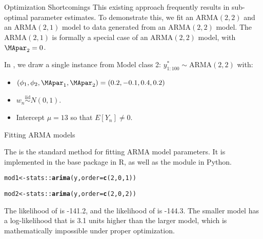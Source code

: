 \documentclass[aspectratio=169]{beamer}\usepackage[]{graphicx}\usepackage[]{xcolor}
\makeatletter
\newcommand{\hlnum}[1]{\textcolor[rgb]{0.686,0.059,0.569}{#1}}%
\newcommand{\hlopt}[1]{\textcolor[rgb]{0,0,0}{#1}}%
\newcommand{\hldef}[1]{\textcolor[rgb]{0.345,0.345,0.345}{#1}}%
\newcommand{\hlkwb}[1]{\textcolor[rgb]{0.69,0.353,0.396}{#1}}%
\newcommand{\hlkwc}[1]{\textcolor[rgb]{0.333,0.667,0.333}{#1}}%
\newcommand{\hlkwd}[1]{\textcolor[rgb]{0.737,0.353,0.396}{\textbf{#1}}}%
\newenvironment{kframe}{%
 \def\at@end@of@kframe{}%
 \ifinner\ifhmode%
  \def\at@end@of@kframe{\end{minipage}}%
  \begin{minipage}{\columnwidth}%
 \fi\fi%
 \def\FrameCommand##1{\hskip\@totalleftmargin \hskip-\fboxsep
 \colorbox{shadecolor}{##1}\hskip-\fboxsep
     \hskip-\linewidth \hskip-\@totalleftmargin \hskip\columnwidth}%
 \MakeFramed {\advance\hsize-\width
   \@totalleftmargin\z@ \linewidth\hsize
   \@setminipage}}%
 {\par\unskip\endMakeFramed%
 \at@end@of@kframe}
\newenvironment{knitrout}{}{} %
\makeatother
\begin{document}
\begin{frame}{Optimization Shortcomings}
This existing approach frequently results in sub-optimal parameter estimates.
To demonstrate this, we fit an ARMA$(2, 2)$ and an ARMA$(2, 1)$ model to data generated from an ARMA$(2, 2)$ model. 
The ARMA$(2, 1)$ is formally a special case of an ARMA$(2, 2)$ model, with $\MApar_2 = 0$. 

In , we draw a single instance from Model class 2: $y^*_{1:100} \sim \mathrm{ARMA}(2, 2)$ with: 
\begin{itemize}
  \item $(\phi_1, \phi_2, \MApar_1, \MApar_2) = (0.2, -0.1, 0.4, 0.2)$
  \item $w_n \overset{\text{iid}}{\sim} N(0, 1)$. 
  \item Intercept $\mu = 13$ so that $E[Y_n] \neq 0$.
\end{itemize}



\end{frame}

\begin{frame}{Fitting ARMA models}

The \citet{gardner1980} is the standard method for fitting ARMA model parameters. It is implemented in the base  package in R, as well as the  module in Python.

\begin{knitrout}
\color{fgcolor}\begin{kframe}
\begin{alltt}
\hldef{mod1} \hlkwb{<-} \hldef{stats}\hlopt{::}\hlkwd{arima}\hldef{(y,} \hlkwc{order} \hldef{=} \hlkwd{c}\hldef{(}\hlnum{2}\hldef{,} \hlnum{0}\hldef{,} \hlnum{1}\hldef{))}

\hldef{mod2} \hlkwb{<-} \hldef{stats}\hlopt{::}\hlkwd{arima}\hldef{(y,} \hlkwc{order} \hldef{=} \hlkwd{c}\hldef{(}\hlnum{2}\hldef{,} \hlnum{0}\hldef{,} \hlnum{2}\hldef{))}
\end{alltt}
\end{kframe}
\end{knitrout}

\pause 
The likelihood of  is -141.2, and the likelihood of  is -144.3. The \alert{smaller} model has a log-likelihood that is 3.1 units \alert{higher} than the larger model, which is mathematically impossible under proper optimization. 
\end{frame}
\end{document}

